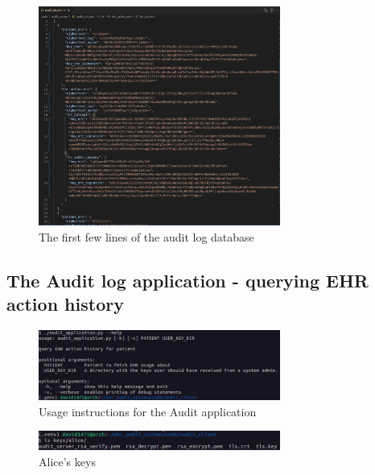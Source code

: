 \documentclass[11pt]{article}
\begin{document}
\begin{flushleft}
\newpage

\begin{figure}[h!]
\begin{center}
	\includegraphics[width = 300px]{images/audit_db_enc.png}
	\caption{The first few lines of the audit log database}
\end{center}
\end{figure}

\subsection{The Audit log application - querying EHR action history}

\begin{figure}[h!]
	\begin{center}
		\includegraphics[width = 300px]{images/audit_application_help.png}
		\caption{Usage instructions for the Audit application}
	\end{center}
\end{figure}

\begin{figure}[h!]
\begin{center}
	\includegraphics[width = 300px]{images/alice_keys.png}
	\caption{Alice's keys}
\end{center}
\end{figure}


\end{flushleft}
\end{document}
